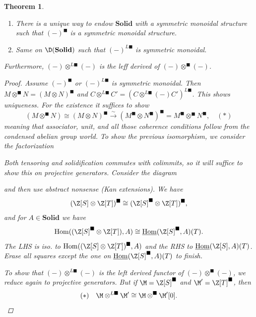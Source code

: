 \documentclass[A4paper, british]{amsart}
\theoremstyle{darkgreentheorem}
\newtheorem{thm}{Theorem}[section]
\theoremstyle{darkbluedefinition}
\theoremstyle{darkredexample}
\theoremstyle{remark}
\DeclareMathOperator{\Hom}{Hom}
\DeclareMathOperator{\Cond}{Cond}
\DeclareMathOperator{\ihom}{\underline{Hom}}
\newcommand{\Solid}{\mathbf{Solid}}
\newcommand{\1}{\mathbbm{1}}
\newcommand{\ot}{\otimes}
\newcommand{\tms}{\times}
\newcommand{\solid}{^{\blacksquare}}
\newcommand{\dsolid}{^{L\blacksquare}}
\begin{document}
\begin{thm}
    \begin{enumerate}
	\item There is a unique way to endow $\Solid$ with a symmetric monoidal structure such that $(-)\solid$ is a symmetric monoidal structure.
	\item Same on $\D(\Solid)$ such that $(-)\dsolid$ is symmetric monoidal.
    \end{enumerate}
    Furthermore, $(-)\ot\dsolid (-)$ is the leff derived of $(-)\ot\solid(-)$.
    \begin{proof}
	Assume $(-)\solid$ or $(-)\dsolid$ is symmetric monoidal.
	Then $M\ot\solid N=(M\ot N)\solid$ and $C\ot\dsolid C'=(C\ot\dsolid(-)C')\dsolid$.
	This shows uniqueness.
	For the existence it suffices to show
	\[ (M\ot\solid N)\cong (M\ot N)\solid\xrightarrow{\sim} (M\solid\ot N\solid)\solid=M\solid\ot\solid N\solid, \quad (*)\]
	meaning that associator, unit, and all those coherence conditions follow from the condensed abelian group world.
	To show the previous isomorphism, we consider the factorization
	\begin{center}
	\end{center}
	Both tensoring and solidification commutes with colimmits, so it will suffice to show this on projective generators.
	Consider the diagram
	\begin{center}
	\end{center}
	and then use abstract nonsense (Kan extensions).
	We have
	\[(\Z[S]\ot \Z[T])\solid \cong (\Z[S]\solid\ot \Z[T])\solid,\]
	and for $A\in \Solid$ we have
	\[ \Hom((\Z[S]\solid \ot \Z[T]),A)\cong \ihom(\Z[S]\solid,A)(T).\]
	The LHS is iso. to $\Hom((\Z[S]\ot \Z[T])\solid,A)$ and the RHS to $\ihom(\Z[S],A)(T)$.
	Erase all squares except the one on $\ihom(\Z[S]\solid,A)(T)$ to finish.
	
	To show that $(-)\ot\dsolid (-)$ is the left derived functor of $(-)\ot\solid(-)$, we reduce again to projective generators.
	But if $\M=\Z[S]\solid $ and $\M'=\Z[T]\solid$, then
	\[ (*)\quad \M\ot\dsolid\M'\cong \M\ot\solid \M'[0].\]
    \end{proof}
\end{thm}
\end{document}
